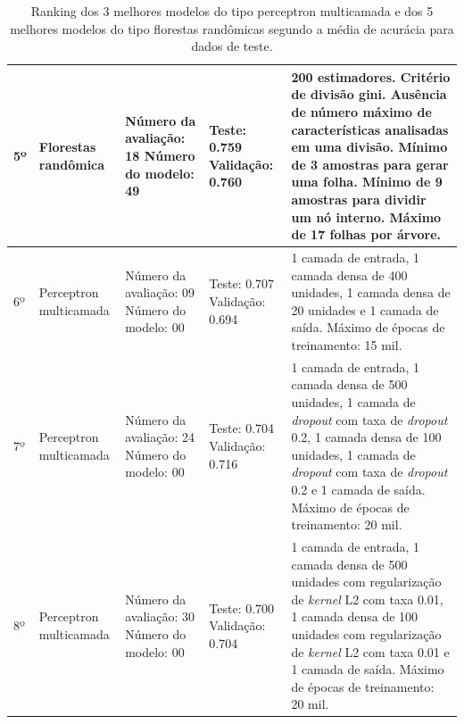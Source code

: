 \begin{table}[ht!]
\begin{center}
{\begin{tabular}{|p{1.25cm}|p{2cm}|p{2cm}|p{2.5cm}|p{6.75cm}|}
    \hline
    5º & Florestas randômica & Número da \newline avaliação: 18 \newline Número do \newline modelo: 49 & Teste: 0.759 \newline Validação: 0.760 & 200 estimadores. Critério de divisão gini. Ausência de número máximo de características analisadas em uma divisão. Mínimo de 3 amostras para gerar uma folha. Mínimo de 9 amostras para dividir um nó interno. Máximo de 17 folhas por árvore. \\
    \hline
    6º & Perceptron multicamada & Número da \newline avaliação: 09 \newline Número do \newline modelo: 00 & Teste: 0.707 \newline Validação: 0.694 & 1 camada de entrada, 1 camada densa de 400 unidades, 1 camada densa de 20 unidades e 1 camada de saída. Máximo de épocas de treinamento: 15 mil. \\
    \hline
    7º & Perceptron multicamada & Número da \newline avaliação: 24 \newline Número do \newline modelo: 00 & Teste: 0.704 \newline Validação: 0.716 & 1 camada de entrada, 1 camada densa de 500 unidades, 1 camada de \textit{dropout} com taxa de \textit{dropout} 0.2, 1 camada densa de 100 unidades, 1 camada de \textit{dropout} com taxa de \textit{dropout} 0.2 e 1 camada de saída. Máximo de épocas de treinamento: 20 mil. \\
    \hline
    8º & Perceptron multicamada & Número da \newline avaliação: 30 \newline Número do \newline modelo: 00 & Teste: 0.700 \newline Validação: 0.704 & 1 camada de entrada, 1 camada densa de 500 unidades com regularização de \textit{kernel} L2 com taxa 0.01, 1 camada densa de 100 unidades com regularização de \textit{kernel} L2 com taxa 0.01 e 1 camada de saída. Máximo de épocas de treinamento: 20 mil. \\
    \hline
    \end{tabular}
  }
  \caption{Ranking dos 3 melhores modelos do tipo perceptron multicamada e dos 5 melhores modelos do tipo florestas randômicas segundo a média de acurácia para dados de teste.}
  \label{table:ranking_melhores_modelos}
  \end{center}
\end{table}

